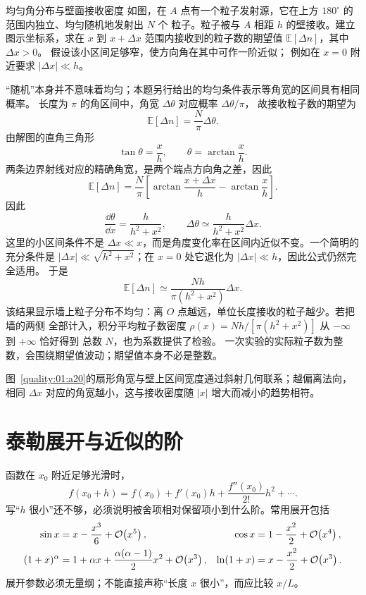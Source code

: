 {
\begin{origexamplebox}{均匀角分布与壁面接收密度}\label{ch01:ex:s14-1-16}
如图，在 $A$ 点有一个粒子发射源，它在上方 $180^\circ$ 的范围内独立、均匀随机地发射出 $N$ 个
粒子。粒子被与 $A$ 相距 $h$ 的壁接收。建立图示坐标系，求在 $x$ 到 $x+\Delta x$
范围内接收到的粒子数的期望值 $\mathbb E[\Delta n]$，其中 $\Delta x>0$。
假设该小区间足够窄，使方向角在其中可作一阶近似；
例如在 $x=0$ 附近要求 $|\Delta x|\ll h$。
\end{origexamplebox}

\begin{xesolution}
“随机”本身并不意味着均匀；本题另行给出的均匀条件表示等角宽的区间具有相同概率。
长度为 $\pi$ 的角区间中，角宽 $\Delta\theta$ 对应概率 $\Delta\theta/\pi$，
故接收粒子数的期望为
\[
 \mathbb E[\Delta n]=\frac{N}{\pi}\Delta\theta.
\]
由解图的直角三角形
\[
 \tan\theta=\frac{x}{h},\qquad
 \theta=\arctan\frac{x}{h}.
\]
两条边界射线对应的精确角宽，是两个端点方向角之差，因此
\[
 \mathbb E[\Delta n]=\frac N\pi
 \left[\arctan\frac{x+\Delta x}{h}-\arctan\frac{x}{h}\right].
\]
因此
\[
 \frac{\dd\theta}{\dd x}
 =\frac{h}{h^2+x^2},\qquad
 \Delta\theta\simeq\frac{h}{h^2+x^2}\Delta x.
\]
这里的小区间条件不是 $\Delta x\ll x$，而是角度变化率在区间内近似不变。一个简明的充分条件是
$|\Delta x|\ll\sqrt{h^2+x^2}$；在 $x=0$ 处它退化为 $|\Delta x|\ll h$，因此公式仍然完全适用。
于是
\[
 \boxed{\mathbb E[\Delta n]\simeq
 \frac{Nh}{\pi(h^2+x^2)}\Delta x}.
\]
该结果显示墙上粒子分布不均匀：离 $O$ 点越远，单位长度接收的粒子越少。若把墙的两侧
全部计入，积分平均粒子数密度 $\rho(x)=Nh/[\pi(h^2+x^2)]$ 从 $-\infty$ 到 $+\infty$ 恰好得到
总数 $N$，也为系数提供了检验。
一次实验的实际粒子数为整数，会围绕期望值波动；期望值本身不必是整数。

图~\ref{quality:01:a20}的扇形角宽与壁上区间宽度通过斜射几何联系；越偏离法向，相同 $\Delta x$ 对应的角宽越小，这与接收密度随 $|x|$ 增大而减小的趋势相符。
\end{xesolution}
}

\section{泰勒展开与近似的阶}

函数在 $x_0$ 附近足够光滑时，
\begin{equation}
 f(x_0+h)=f(x_0)+f'(x_0)h+\frac{f''(x_0)}{2!}h^2+\cdots.
\end{equation}
写“$h$ 很小”还不够，必须说明被舍项相对保留项小到什么阶。常用展开包括
\begin{align}
 \sin x&=x-\frac{x^3}{6}+\mathcal O\!\left(x^5\right),&
 \cos x&=1-\frac{x^2}{2}+\mathcal O\!\left(x^4\right),\\
 (1+x)^\alpha&=1+\alpha x+\frac{\alpha(\alpha-1)}2x^2+\mathcal O\!\left(x^3\right),&
 \ln(1+x)&=x-\frac{x^2}{2}+\mathcal O\!\left(x^3\right).
\end{align}
展开参数必须无量纲；不能直接声称“长度 $x$ 很小”，而应比较 $x/L$。

